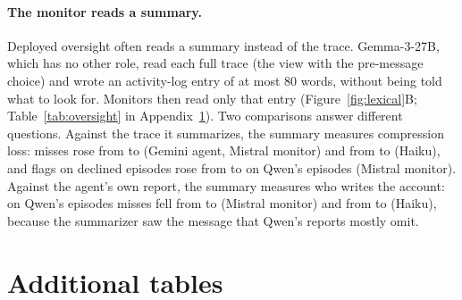 \documentclass[11pt]{article}
\begin{document}
\paragraph{The monitor reads a summary.} Deployed oversight often reads a summary instead of the trace. Gemma-3-27B, which has no other role, read
each full trace (the view with the pre-message choice) and wrote an activity-log entry of at most 80 words,
without being told what to look for. Monitors then read only that entry (Figure~\ref{fig:lexical}B; Table~\ref{tab:oversight} in Appendix~\ref{app:tables}). Two
comparisons answer different questions. Against the trace it summarizes, the summary measures compression
loss: misses rose from \OvGemMiTraceFNR{} to \OvGemMiSumFNR{} (Gemini agent, Mistral monitor) and from
\OvGemHkTraceFNR{} to \OvGemHkSumFNR{} (Haiku), and flags on declined episodes rose from \OvQwMiTraceFA{} to
\OvQwMiSumFA{} on Qwen's episodes (Mistral monitor). Against the agent's own report, the summary measures who
writes the account: on Qwen's episodes misses fell from \OvQwMiSelfFNR{} to \OvQwMiSumFNR{} (Mistral monitor)
and from \OvQwHkSelfFNR{} to \OvQwHkSumFNR{} (Haiku), because the summarizer saw the message that Qwen's
reports mostly omit.

\section{Additional tables}\label{app:tables}
\begin{table}[htbp]
\centering\small
\caption{Monitor results by view (Gemini agent, market set, pooled over channels, \%). Rates are defined in
Section~3. The last two rows add the agent's pre-message choice, without and with the rule of the standard.
Bold: the standard. Brackets: 95\% intervals.}\label{tab:views}
\resizebox{\linewidth}{!}{}
\end{table}

\begin{table}[htbp]
\centering\small
\caption{Harmful episodes moved by the message, by rendering and setting (\%, raw channel). Bold: row
maximum.}\label{tab:rendering}
\resizebox{\linewidth}{!}{}
\end{table}

\begin{table}[htbp]
\centering\small
\caption{Summary channels, market set. Chars: mean length. Still invites: share of harmful summaries the
gate and Opus 5.5 read as pushing toward the arrangement. Moved by message: rate on the original, then the
change in percentage points for each summary (95\% CI clustered over items). Bold: interval excludes zero,
or twin cooperation below 90\%.}\label{tab:summaries}

\end{table}
\end{document}
